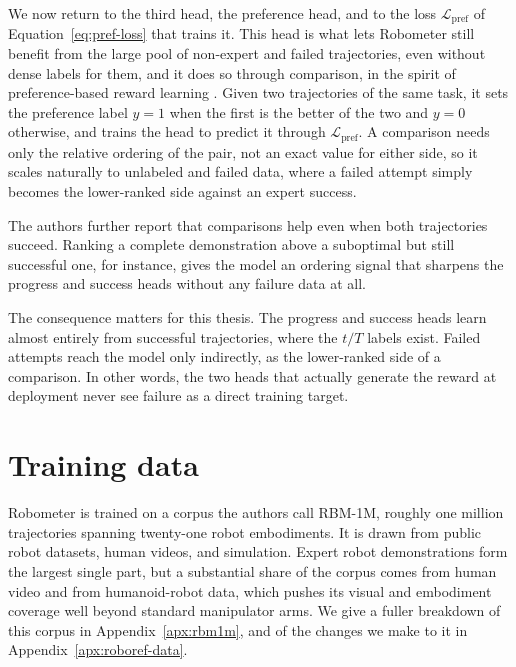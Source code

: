We now return to the third head, the preference head, and to the loss $\mathcal{L}_{\mathrm{pref}}$ of Equation~\ref{eq:pref-loss} that trains it. This head is what lets Robometer still benefit from the large pool of non-expert and failed trajectories, even without dense labels for them, and it does so through comparison, in the spirit of preference-based reward learning \citep{wang_rl-vlm-f_2024}. Given two trajectories of the same task, it sets the preference label $y = 1$ when the first is the better of the two and $y = 0$ otherwise, and trains the head to predict it through $\mathcal{L}_{\mathrm{pref}}$. A comparison needs only the relative ordering of the pair, not an exact value for either side, so it scales naturally to unlabeled and failed data, where a failed attempt simply becomes the lower-ranked side against an expert success.

The authors further report that comparisons help even when both trajectories succeed. Ranking a complete demonstration above a suboptimal but still successful one, for instance, gives the model an ordering signal that sharpens the progress and success heads without any failure data at all.

The consequence matters for this thesis. The progress and success heads learn almost entirely from successful trajectories, where the $t/T$ labels exist. Failed attempts reach the model only indirectly, as the lower-ranked side of a comparison. In other words, the two heads that actually generate the reward at deployment never see failure as a direct training target.

\section{Training data}

Robometer is trained on a corpus the authors call RBM-1M, roughly one million trajectories spanning twenty-one robot embodiments. It is drawn from public robot datasets, human videos, and simulation. Expert robot demonstrations form the largest single part, but a substantial share of the corpus comes from human video and from humanoid-robot data, which pushes its visual and embodiment coverage well beyond standard manipulator arms. We give a fuller breakdown of this corpus in Appendix~\ref{apx:rbm1m}, and of the changes we make to it in Appendix~\ref{apx:roboref-data}.
